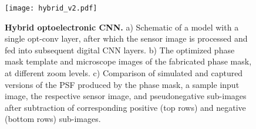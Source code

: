 \documentclass[fleqn,10pt]{wlscirep}
\begin{document}
\begin{figure}
\centering
\texttt{[image: hybrid\_v2.pdf]}
\caption{\textbf{Hybrid optoelectronic CNN.} a) Schematic of a model with a single opt-conv layer, after which the sensor image is processed and fed into subsequent digital CNN layers. b) The optimized phase mask template and microscope images of the fabricated phase mask, at different zoom levels. c) Comparison of simulated and captured versions of the PSF produced by the phase mask, a sample input image, the respective sensor image, and pseudonegative sub-images after subtraction of corresponding positive (top rows) and negative (bottom rows) sub-images. }
\label{fig:hybrid}
\end{figure}
\end{document}

